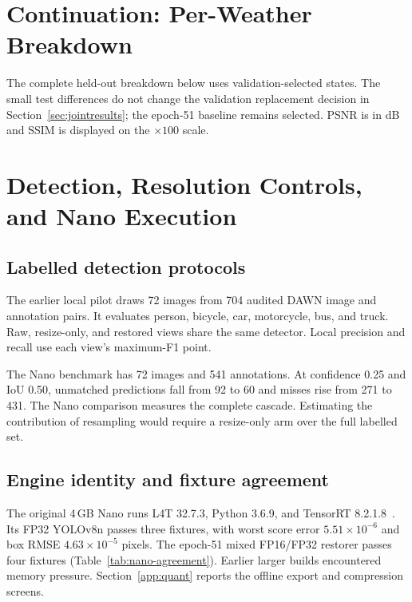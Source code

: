 \section{Continuation: Per-Weather Breakdown}
\label{app:joint}
The complete held-out breakdown below uses validation-selected states.
The small test differences do not change the validation replacement decision
in Section~\ref{sec:jointresults}; the epoch-51 baseline remains selected.
PSNR is in dB and SSIM is displayed on the $\times100$ scale.

\clearpage
\begingroup
\raggedbottom
\captionsetup{hypcap=false}
\section{Detection, Resolution Controls, and Nano Execution}
\label{app:hardware}

\newcommand{\AegisEvidenceColumns}[2]{%
  \noindent\begin{minipage}[t]{.477\linewidth}\vspace{0pt}#1\end{minipage}\hfill
  \begin{minipage}[t]{.477\linewidth}\vspace{0pt}#2\end{minipage}\par
}

\AegisEvidenceColumns{%
\subsection{Labelled detection protocols}
The earlier local pilot draws 72 images from 704 audited DAWN image and annotation pairs. It evaluates person, bicycle, car, motorcycle, bus, and truck. Raw, resize-only, and restored views share the same detector. Local precision and recall use each view's maximum-F1 point.

The Nano benchmark has 72 images and 541 annotations. At confidence 0.25 and IoU 0.50, unmatched predictions fall from 92 to 60 and misses rise from 271 to 431. The Nano comparison measures the complete cascade. Estimating the contribution of resampling would require a resize-only arm over the full labelled set.
}{%
\subsection{Engine identity and fixture agreement}
The original 4\,GB Nano runs L4T 32.7.3, Python 3.6.9, and TensorRT 8.2.1.8~\cite{NVIDIA_Compute,NVIDIA_TensorRT}. Its FP32 YOLOv8n passes three fixtures, with worst score error $5.51\times10^{-6}$ and box RMSE $4.63\times10^{-5}$ pixels. The epoch-51 mixed FP16/FP32 restorer passes four fixtures (Table~\ref{tab:nano-agreement}). Earlier larger builds encountered memory pressure. Section~\ref{app:quant} reports the offline export and compression screens.

\smallskip

}

